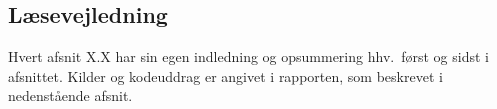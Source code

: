 \subsection{Læsevejledning}

Hvert afsnit X.X har sin egen indledning og opsummering hhv.\ først og sidst i afsnittet. Kilder og kodeuddrag er angivet i rapporten, som beskrevet i nedenstående afsnit.





